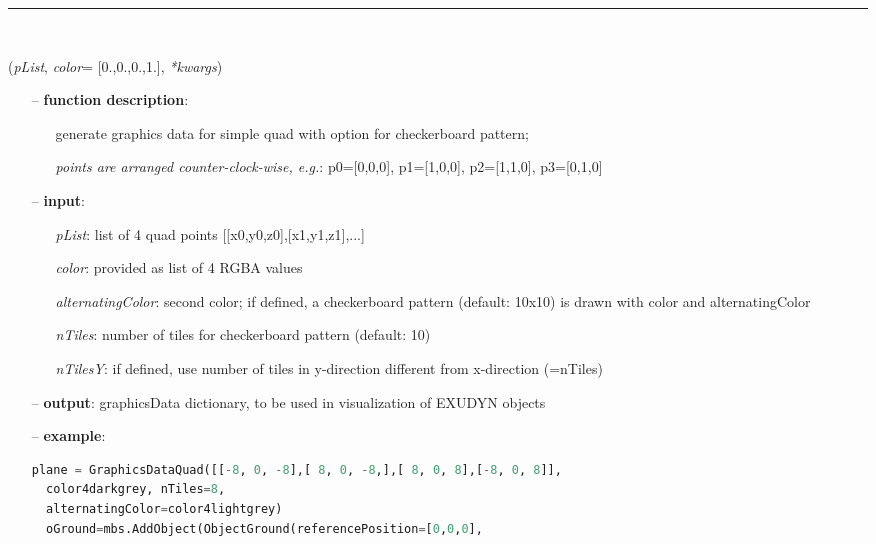 \begin{itemize}[leftmargin=1.4cm]
\begin{itemize}[leftmargin=1.4cm]
\begin{itemize}[leftmargin=0.5cm]
\begin{itemize}[leftmargin=1.4cm]
\begin{itemize}[leftmargin=1.4cm]
\begin{itemize}[leftmargin=0.5cm]
\begin{itemize}[leftmargin=1.4cm]
\begin{itemize}[leftmargin=0.5cm]
%
\noindent\rule{8cm}{0.75pt}\vspace{1pt} \\ 
\begin{flushleft}
\label{sec:graphicsDataUtilities:GraphicsDataQuad}
({\it pList}, {\it color}= [0.,0.,0.,1.], {\it **kwargs})
\end{flushleft}
\setlength{\itemindent}{0.7cm}
\begin{itemize}[leftmargin=0.7cm]
\item[--]{\bf function description}: \vspace{-6pt}
\begin{itemize}[leftmargin=1.2cm]
\setlength{\itemindent}{-0.7cm}
\item[]generate graphics data for simple quad with option for checkerboard pattern;
\item[]{\it points are arranged counter-clock-wise, e.g.}: p0=[0,0,0], p1=[1,0,0], p2=[1,1,0], p3=[0,1,0]
\end{itemize}
\item[--]{\bf input}: \vspace{-6pt}
\begin{itemize}[leftmargin=1.2cm]
\setlength{\itemindent}{-0.7cm}
\item[]{\it pList}: list of 4 quad points [[x0,y0,z0],[x1,y1,z1],...]
\item[]{\it color}: provided as list of 4 RGBA values
\item[]{\it alternatingColor}: second color; if defined, a checkerboard pattern (default: 10x10) is drawn with color and alternatingColor
\item[]{\it nTiles}: number of tiles for checkerboard pattern (default: 10)
\item[]{\it nTilesY}: if defined, use number of tiles in y-direction different from x-direction (=nTiles)
\end{itemize}
\item[--]{\bf output}: graphicsData dictionary, to be used in visualization of EXUDYN objects
\item[--]{\bf example}: \vspace{-12pt}\ei\begin{lstlisting}[language=Python, xleftmargin=36pt]
  plane = GraphicsDataQuad([[-8, 0, -8],[ 8, 0, -8,],[ 8, 0, 8],[-8, 0, 8]],
  color4darkgrey, nTiles=8,
  alternatingColor=color4lightgrey)
  oGround=mbs.AddObject(ObjectGround(referencePosition=[0,0,0],

\end{lstlisting}
\end{itemize}
\end{itemize}
\end{itemize}
\end{itemize}
\end{itemize}
\end{itemize}
\end{itemize}
\end{itemize}
\end{itemize}
